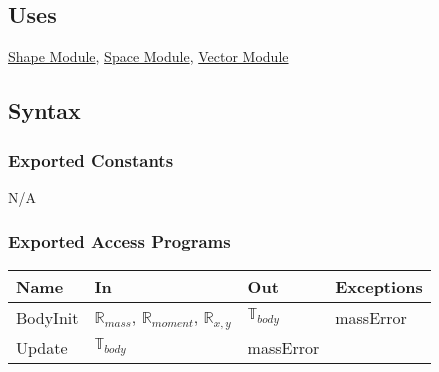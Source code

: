 \documentclass[12pt]{article}
\newcommand{\Shape}{\hyperref[MISShape]{Shape Module}}
\newcommand{\Space}{\hyperref[MISSpace]{Space Module}}
\newcommand{\Vector}{\hyperref[MISVector]{Vector Module}}
\newcommand{\Transform}{\hyperref[MISTransform]{Transform Matrix Module}}
\newcommand{\SpatialIndex}{\hyperref[MISSpatial]{Spatial Index Module}}
\newcommand{\Sequence}{\hyperref[MISSequence]{Sequence Data Structure Module}}
\begin{document}
\subsection{Uses} \label{SecUBody}
	\Shape, \Space, \Vector %
	
\subsection{Syntax}

\subsubsection{Exported Constants}

N/A

	
\subsubsection{Exported Access Programs} \label{SecEAPBody}

\begin{center}
	\begin{tabular}{p{2cm} p{4cm} p{4cm} p{2cm}}
		\hline
		\textbf{Name} & \textbf{In} & \textbf{Out} & \textbf{Exceptions} \\
		\hline
		{BodyInit} & $\mathbb{R}$$_{mass}$, $\mathbb{R}$$_{moment}$, $\mathbb{R}$$_{x,y}$ & $\mathbb{T}$$_{body}$ & massError \\
		\hline
		{Update} & $\mathbb{T}$$_{body}$ & massError \\
		\hline
	\end{tabular}
\end{center}
\end{document}
